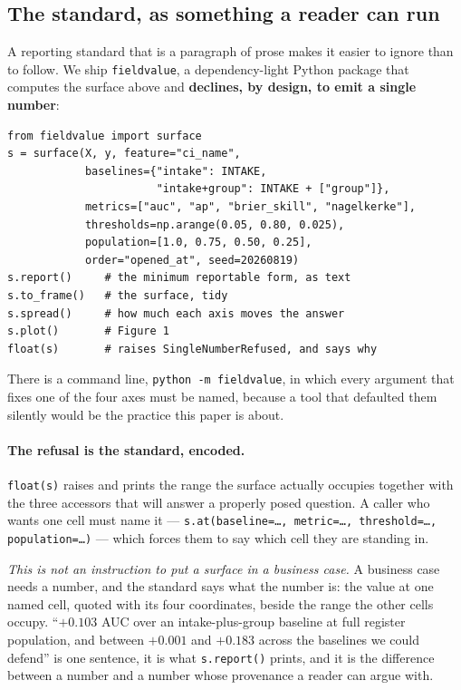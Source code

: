 \documentclass[preprint,12pt]{elsarticle}
\begin{document}
\subsection{The standard, as something a reader can run}
\label{sec:tool}

A reporting standard that is a paragraph of prose makes it easier to ignore
than to follow. We ship \texttt{fieldvalue}, a dependency-light Python package
that computes the surface above and \textbf{declines, by design, to emit a
single number}:

\begin{verbatim}
from fieldvalue import surface
s = surface(X, y, feature="ci_name",
            baselines={"intake": INTAKE,
                       "intake+group": INTAKE + ["group"]},
            metrics=["auc", "ap", "brier_skill", "nagelkerke"],
            thresholds=np.arange(0.05, 0.80, 0.025),
            population=[1.0, 0.75, 0.50, 0.25],
            order="opened_at", seed=20260819)
s.report()     # the minimum reportable form, as text
s.to_frame()   # the surface, tidy
s.spread()     # how much each axis moves the answer
s.plot()       # Figure 1
float(s)       # raises SingleNumberRefused, and says why
\end{verbatim}

\noindent There is a command line, \texttt{python -m fieldvalue}, in which
every argument that fixes one of the four axes must be named, because a tool
that defaulted them silently would be the practice this paper is about.

\paragraph{The refusal is the standard, encoded.} \texttt{float(s)} raises
and prints the range the surface actually occupies together with the three
accessors that will answer a properly posed question. A caller who wants one
cell must name it --- \texttt{s.at(baseline=\ldots, metric=\ldots,
threshold=\ldots, population=\ldots)} --- which forces them to say which cell
they are standing in.

\emph{This is not an instruction to put a surface in a business case.} A
business case needs a number, and the standard says what the number is: the
value at one named cell, quoted with its four coordinates, beside the range
the other cells occupy. ``$+0.103$ AUC over an intake-plus-group baseline at
full register population, and between $+0.001$ and $+0.183$ across the
baselines we could defend'' is one sentence, it is what \texttt{s.report()}
prints, and it is the difference between a number and a number whose
provenance a reader can argue with.
\end{document}

